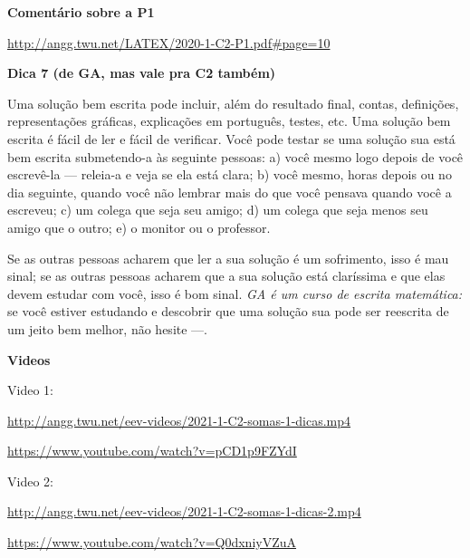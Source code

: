 \documentclass[oneside,12pt]{article}
\begin{document}
{\bf Comentário sobre a P1}


{\footnotesize

\url{http://angg.twu.net/LATEX/2020-1-C2-P1.pdf#page=10}

}

\newpage

%                            

\vspace*{-1.0cm}

{\bf Dica 7 (de GA, mas vale pra C2 também)}

Uma solução bem escrita pode incluir, além do resultado final, contas,
definições, representações gráficas, explicações em português, testes,
etc. Uma solução bem escrita é fácil de ler e fácil de verificar. Você
pode testar se uma solução sua está bem escrita submetendo-a às
seguinte pessoas: a) você mesmo logo depois de você escrevê-la ---
releia-a e veja se ela está clara; b) você mesmo, horas depois ou no
dia seguinte, quando você não lembrar mais do que você pensava quando
você a escreveu; c) um colega que seja seu amigo; d) um colega que
seja menos seu amigo que o outro; e) o monitor ou o professor.

Se as outras pessoas acharem que ler a sua solução é um sofrimento,
isso é mau sinal; se as outras pessoas acharem que a sua solução está
claríssima e que elas devem estudar com você, isso é bom sinal. {\sl
  GA é um curso de escrita matemática:} se você estiver estudando e
descobrir que uma solução sua pode ser reescrita de um jeito bem
melhor, não hesite ---.


\newpage

{\bf Videos}

Video 1:

{\footnotesize

\url{http://angg.twu.net/eev-videos/2021-1-C2-somas-1-dicas.mp4}

\url{https://www.youtube.com/watch?v=pCD1p9FZYdI}

}

\msk

Video 2:

{\footnotesize

\url{http://angg.twu.net/eev-videos/2021-1-C2-somas-1-dicas-2.mp4}

\url{https://www.youtube.com/watch?v=Q0dxniyVZuA}

}
















\end{document}
